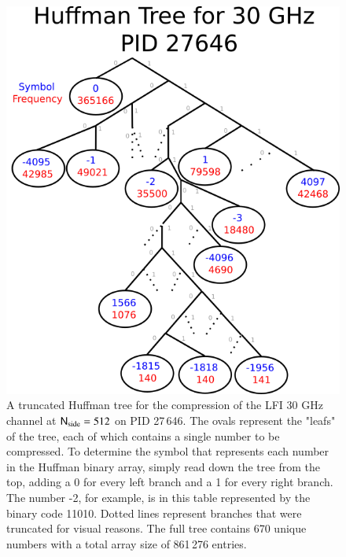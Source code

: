 \documentclass[twocolumn]{aa}
\newcommand{\N}[0]{\tens{N}}
\begin{document}
\begin{figure}[t]
  \center
  \includegraphics[width=\linewidth]{figs/huff_tree.png}
  \caption{A truncated Huffman tree for the compression of the LFI 30 GHz channel at $\N_{\mathrm{side}}=512$ on PID 27\,646. The ovals represent the "leafs" of the tree, each of which contains a single number to be compressed. To determine the symbol that represents each number in the Huffman binary array, simply read down the tree from the top, adding a 0 for every left branch and a 1 for every right branch. The number -2, for example, is in this table represented by the binary code 11010. Dotted lines represent branches that were truncated for visual reasons. The full tree contains 670 unique numbers with a total array size of 861\,276 entries.
  }\label{fig:huffman}
\end{figure}
\end{document}
